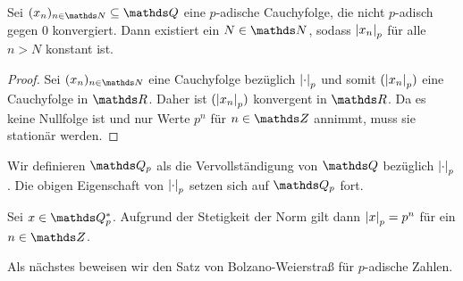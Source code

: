 
\begin{satz}
Sei $(x_n)_{n \in \N} \subseteq \Q$ eine $p$-adische Cauchyfolge, die nicht $p$-adisch gegen $0$ konvergiert.
Dann existiert ein $N \in \N$, sodass $\left\vert x_n\right\vert_p$ für alle $n>N$ konstant ist.
\begin{proof}
Sei $(x_n)_{n\in \N}$ eine Cauchyfolge bezüglich $\left\vert\cdot\right\vert_p$ und somit $(\left\vert x_n\right\vert_p)$ eine Cauchyfolge in $\R$.
Daher ist $(\left\vert x_n\right\vert_p)$ konvergent in $\R$. Da es keine Nullfolge ist und nur Werte $p^n$ für $n\in \Z$ annimmt, muss sie stationär werden.
\end{proof}
\end{satz}

\begin{defi}
Wir definieren $\Q_p$ als die Vervollständigung von $\Q$ bezüglich $\left\vert\cdot\right\vert_p$.
Die obigen Eigenschaft von $\left\vert\cdot\right\vert_p$ setzen sich auf $\Q_p$ fort.
\end{defi}

\begin{bsp}
Sei $x\in \Q_p^\ast$. Aufgrund der Stetigkeit der Norm gilt dann $\left\vert x\right\vert_p=p^n$ für ein $n\in \Z$.
\end{bsp}
Als nächstes beweisen wir den Satz von Bolzano-Weierstraß für $p$-adische Zahlen.

